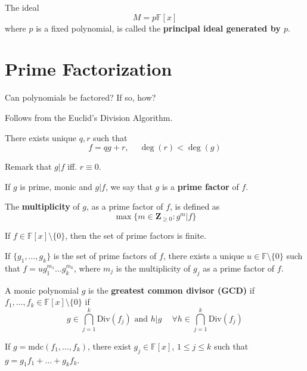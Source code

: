The ideal \[ M = p \mathbb{F}[x] \] where $p$ is a fixed polynomial, is called the \textbf{principal ideal generated by $p$}.

\section{Prime Factorization}

Can polynomials be factored? If so, how?

Follows from the Euclid's Division Algorithm.

There exists unique $q, r$ such that 
\[
	f = qg + r, ~\quad \deg(r) < \deg(g)
\]

Remark that $g | f$  iff. $r \equiv 0$.

\begin{definition}
	If $g$ is prime, monic and $g | f$, we say that $g$ is a \textbf{prime factor} of $f$.
	
	The \textbf{multiplicity} of $g$, as a prime factor of $f$, is defined as
	\[
		\max \{ m \in \textbf{Z}_{\geq 0} : g^m | f \}
	\]
\end{definition}

\begin{theorem}
	If $f \in \mathbb{F}[x] \setminus \{ 0 \}$, then the set of prime factors is finite.
	
If $\{ g_1, \ldots, g_k \}$ is the set of prime factors of $f$, there exists a unique $u \in \mathbb{F} \setminus \{ 0 \}$ such that $f = u g_1^{m_1} \ldots g_k^{m_k}$, where $m_j$ is the multiplicity of $g_j$ as a prime factor of $f$.
\end{theorem}

A monic polynomial $g$ is the \textbf{greatest common divisor (GCD)} if $f_1, \ldots, f_k \in \mathbb{F}[x] \setminus \{ 0 \}$ if
\[
	g \in \bigcap_{j=1}^k \text{Div}(f_j) \text{ and } h | g ~\quad \forall h \in \bigcap_{j=1}^k \text{Div}(f_j)
\]

\begin{theorem}
	If $g = \text{mdc}(f_1, \ldots, f_k)$, there exist $g_j \in \mathbb{F}[x]$, $1 \leq j \leq k$ such that $g = g_1 f_1 + \ldots + g_k f_k$.
\end{theorem}